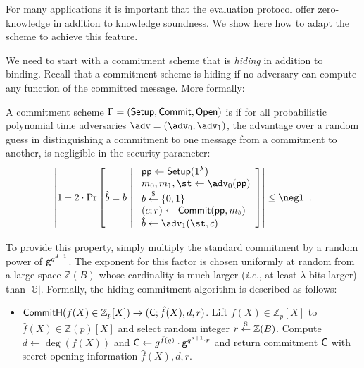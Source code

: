 For many applications it is important that the evaluation protocol offer zero-knowledge in addition to knowledge soundness. We show here how to adapt the scheme to achieve this feature.

We need to start with a commitment scheme that is \emph{hiding} in addition to binding. Recall that a commitment scheme is hiding if no adversary can compute any function of the committed message. More formally:

\begin{definition}
A commitment scheme $\Gamma = (\textsf{{Setup}}, \textsf{{Commit}}, \textsf{{Open}})$ is  if for all probabilistic polynomial time adversaries $\adv = (\adv_0, \adv_1)$, the advantage over a random guess in distinguishing a commitment to one message from a commitment to another, is negligible in the security parameter:
\[
	\left| 1 - 2 \cdot \mathrm{Pr}\left[
		\hat{b} = b \ \middle| \ 
		\begin{array}{l}
			\params \gets \pro{Setup}(1^\lambda) \\
			m_0, m_1, \st \gets \adv_0(\params) \\
			b \sample \{0,1\} \\
			(c; r) \gets \pro{Commit}(\params, m_b) \\
			\hat{b} \gets \adv_1(\st, c)
		\end{array}
	\right] \right| \leq \negl \enspace .
\]
\end{definition}

To provide this property, simply multiply the standard commitment by a random power of $\mathsf{g}^{q^{d+1}}$. The exponent for this factor is chosen uniformly at random from a large space $\mathbb{Z}(B)$ whose cardinality is much larger (\emph{i.e.}, at least $\lambda$ bits larger) than $|\mathbb{G}|$. Formally, the hiding commitment algorithm is described as follows:
\begin{itemize}
	\item $\textsf{{CommitH}}(f(X) \in \mathbb{Z}_p[X]) \rightarrow (\mathsf{C}; \hat{f}(X), d, r)$. Lift $f(X) \in \mathbb{Z}_p[X]$ to $\hat{f}(X) \in \mathbb{Z}(p)[X]$ and select random integer $r \overset{\$}{\gets} \mathbb{Z}(B)$. Compute $d \gets \deg(f(X))$ and $\mathsf{C} \gets g^{\hat{f}(q)} \cdot \mathsf{g}^{q^{d+1} \cdot r}$ and return commitment $\mathsf{C}$ with secret opening information $\hat{f}(X), d, r$.
\end{itemize}

